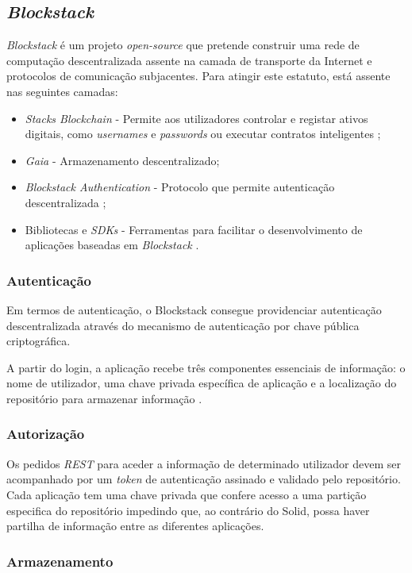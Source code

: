 \subsection{\emph{Blockstack}}
\emph{Blockstack} é um projeto \emph{open-source} que pretende construir uma rede de computação descentralizada assente na camada de transporte da Internet e protocolos de comunicação subjacentes. Para atingir este estatuto, está assente nas seguintes camadas:
\begin{itemize}
	\item \emph{Stacks Blockchain} - Permite aos utilizadores controlar e registar ativos digitais, como \emph{usernames} e \emph{passwords} ou executar contratos inteligentes \cite{blockstack_white_paper};
	\item \emph{Gaia} - Armazenamento descentralizado;
	\item \emph{Blockstack Authentication} - Protocolo que permite autenticação descentralizada \cite{blockstack_white_paper};
	\item Bibliotecas e \emph{SDKs} - Ferramentas para facilitar o desenvolvimento de aplicações baseadas em \emph{Blockstack} \cite{blockstack_white_paper}.
\end{itemize}

\subsubsection{Autenticação}
Em termos de autenticação, o Blockstack consegue providenciar autenticação descentralizada através do mecanismo de autenticação por chave pública criptográfica. 

A partir do login, a aplicação recebe três componentes essenciais de informação: o nome de utilizador, uma chave privada específica de aplicação e a localização do repositório para armazenar informação \cite{blockstack_white_paper}.

\subsubsection{Autorização}
Os pedidos \emph{\acrshort{REST}} para aceder a informação de determinado utilizador devem ser acompanhado por um \emph{token} de autenticação assinado e validado pelo repositório. Cada aplicação tem uma chave privada que confere acesso a uma partição especifica do repositório impedindo que, ao contrário do Solid, possa haver partilha de informação entre as diferentes aplicações.

\subsubsection{Armazenamento}

